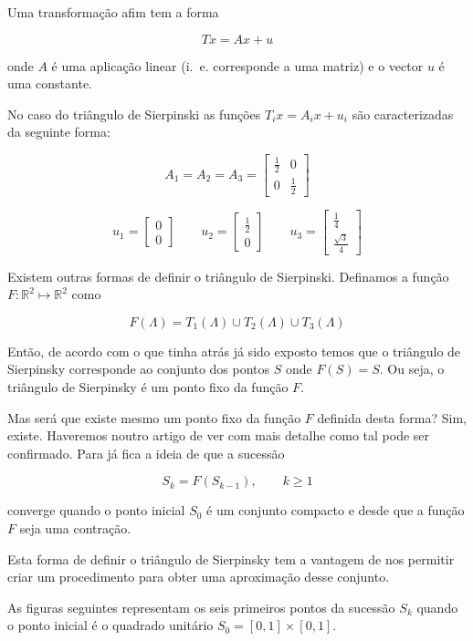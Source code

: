 \documentclass[11pt]{article}
\begin{document}
Uma transformação afim tem a forma

\[
Tx = Ax + u
\]

onde $A$ é uma aplicação linear (i.~e. corresponde a uma matriz) e o
vector $u$ é uma constante.

No caso do triângulo de Sierpinski as funções $T_i x = A_i x + u_i$
são caracterizadas da seguinte forma:

\[
A_1 = A_2 = A_3 = \left[
  \begin{array}{cc}
    \frac{1}{2} & 0 \\
    0 & \frac{1}{2}
  \end{array} \right]
\]


\[
u_1 = \left[
  \begin{array}{c}
    0 \\
    0
  \end{array}
\right]
\qquad
u_2 = \left[
  \begin{array}{c}
    \frac{1}{2} \\
    0 \end{array}
\right]
\qquad
u_3 = \left[
  \begin{array}{c}
    \frac{1}{4} \\
    \frac{\sqrt{3}}{4}
  \end{array}
\right]
\]


Existem outras formas de definir o triângulo de Sierpinski. Definamos
a função $F : {\mathbb R}^2 \mapsto {\mathbb R}^2$ como

\[
F(\Lambda) = T_1(\Lambda) \cup T_2(\Lambda) \cup T_3(\Lambda)
\]

Então, de acordo com o que tinha atrás já sido exposto temos que o
triângulo de Sierpinsky corresponde ao conjunto dos pontos $S$ onde
$F(S)=S$. Ou seja, o triângulo de Sierpinsky é um ponto fixo da função
$F$.

Mas será que existe mesmo um ponto fixo da função $F$ definida desta
forma? Sim, existe. Haveremos noutro artigo de ver com mais detalhe
como tal pode ser confirmado. Para já fica a ideia de que a sucessão

\[
S_k = F(S_{k-1}), \qquad k \ge 1
\]

converge quando o ponto inicial $S_0$ é um conjunto compacto e desde
que a função $F$ seja uma contração.

Esta forma de definir o triângulo de Sierpinsky tem a vantagem de nos
permitir criar um procedimento para obter uma aproximação desse
conjunto.

As figuras seguintes representam os seis primeiros pontos da sucessão
$S_k$ quando o ponto inicial é o quadrado unitário $S_0 = [0,1] \times
[0,1]$.
\end{document}
